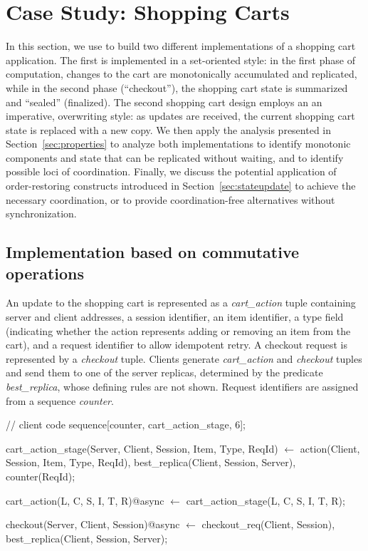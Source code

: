 \section{Case Study: Shopping Carts}
\label{sec:casestudy}

In this section, we use \lang to build two different implementations of a 
shopping cart application.
The first is implemented in a set-oriented style: in the first phase of computation,
changes to the cart are monotonically accumulated and replicated, while in the second
phase (``checkout''), the shopping cart state is summarized and ``sealed'' (finalized).
The second shopping cart design employs an
an imperative, overwriting style: as updates are received, the current shopping cart state
is replaced with a new copy.  We then apply the analysis presented in Section~\ref{sec:properties} 
to analyze both implementations to identify monotonic 
components and state that can be replicated without waiting, and to identify possible
loci of coordination.  Finally, we discuss the potential application of order-restoring
constructs introduced in Section~\ref{sec:stateupdate} to achieve the necessary coordination,
or to provide coordination-free alternatives without synchronization.


\subsection{Implementation based on commutative operations}
An update to the shopping cart is represented as a {\em cart\_action} tuple
containing server and client addresses, a session identifier, an item
identifier, a type field (indicating whether the action represents adding
or removing an item from the cart), and a request identifier to allow
idempotent retry. A checkout request is represented by a {\em checkout}
tuple.  Clients generate {\em cart\_action} and {\em checkout} tuples
and send them to one of the server replicas, determined
by the predicate {\em best\_replica}, whose defining rules are not shown. 
Request identifiers are assigned from a sequence {\em counter}.

\begin{Dedalus}
// client code
sequence[counter, cart_action_stage, 6];

cart_action_stage(Server, Client, Session,
                  Item, Type, ReqId) \(\leftarrow\)
    action(Client, Session, Item, Type, ReqId),
    best_replica(Client, Session, Server),
    counter(ReqId);

cart_action(L, C, S, I, T, R)@async \(\leftarrow\)
    cart_action_stage(L, C, S, I, T, R);

checkout(Server, Client, Session)@async \(\leftarrow\)
    checkout_req(Client, Session),
    best_replica(Client, Session, Server);
\end{Dedalus}

